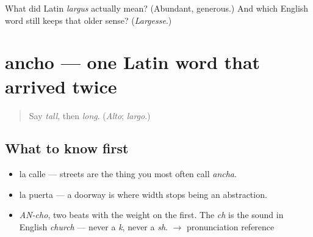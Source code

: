 \begin{tcolorbox}[breakable,colback=teal!4,colframe=teal!35!black,title={Before you move on}]
What did Latin \emph{largus} actually mean? (Abundant, generous.) And which English word still keeps that older sense? (\emph{Largesse}.)
\end{tcolorbox}
\section[ancho]{ancho — one Latin word that arrived twice}

\label{lesson:ES-C365-ancho}



\begin{quote}
Say \emph{tall}, then \emph{long}. (\emph{Alto}; \emph{largo}.)
\end{quote}

\subsection*{What to know first}
\begin{itemize}
\raggedright
  \item la calle — streets are the thing you most often call \emph{ancha}.
  \item la puerta — a doorway is where width stops being an abstraction.
\end{itemize}

\begin{sounds}
\begin{itemize}
\raggedright
  \item \emph{AN-cho}, two beats with the weight on the first. The \emph{ch} is the sound in English \emph{church} — never a \emph{k}, never a \emph{sh}. $\to$ pronunciation reference
\end{itemize}
\end{sounds}

